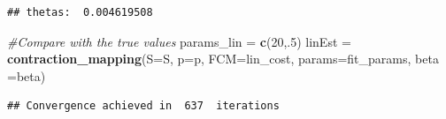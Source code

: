 \documentclass[12pt,a4paper]{article}
\newenvironment{Shaded}{\begin{snugshade}}{\end{snugshade}}
\newcommand{\CommentTok}[1]{\textcolor[rgb]{0.56,0.35,0.01}{\textit{#1}}}
\newcommand{\DataTypeTok}[1]{\textcolor[rgb]{0.13,0.29,0.53}{#1}}
\newcommand{\DecValTok}[1]{\textcolor[rgb]{0.00,0.00,0.81}{#1}}
\newcommand{\KeywordTok}[1]{\textcolor[rgb]{0.13,0.29,0.53}{\textbf{#1}}}
\newcommand{\NormalTok}[1]{#1}
\newcommand{\StringTok}[1]{\textcolor[rgb]{0.31,0.60,0.02}{#1}}
\begin{document}
\begin{verbatim}
## thetas:  0.004619508
\end{verbatim}

\begin{Shaded}
\begin{Highlighting}[]
\CommentTok{#Compare with the true values}
\NormalTok{params_lin =}\StringTok{ }\KeywordTok{c}\NormalTok{(}\DecValTok{20}\NormalTok{,.}\DecValTok{5}\NormalTok{)}
\NormalTok{linEst =}\StringTok{ }\KeywordTok{contraction_mapping}\NormalTok{(}\DataTypeTok{S=}\NormalTok{S, }\DataTypeTok{p=}\NormalTok{p, }\DataTypeTok{FCM=}\NormalTok{lin_cost, }\DataTypeTok{params=}\NormalTok{fit_params, }\DataTypeTok{beta =}\NormalTok{beta)}
\end{Highlighting}
\end{Shaded}

\begin{verbatim}
## Convergence achieved in  637  iterations
\end{verbatim}
\end{document}
